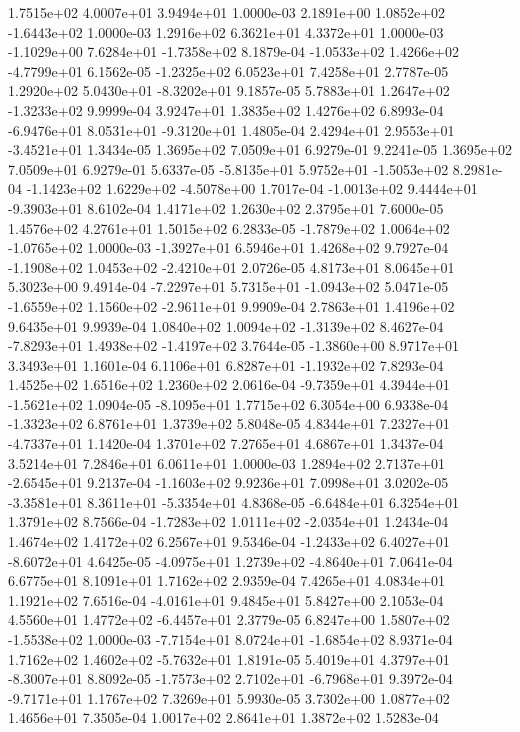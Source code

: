 1.7515e+02 4.0007e+01 3.9494e+01  1.0000e-03
 2.1891e+00  1.0852e+02 -1.6443e+02  1.0000e-03
1.2916e+02 6.3621e+01 4.3372e+01  1.0000e-03
-1.1029e+00  7.6284e+01 -1.7358e+02  8.1879e-04
-1.0533e+02  1.4266e+02 -4.7799e+01  6.1562e-05
-1.2325e+02  6.0523e+01  7.4258e+01  2.7787e-05
 1.2920e+02  5.0430e+01 -8.3202e+01  9.1857e-05
 5.7883e+01  1.2647e+02 -1.3233e+02  9.9999e-04
3.9247e+01 1.3835e+02 1.4276e+02  6.8993e-04
-6.9476e+01  8.0531e+01 -9.3120e+01  1.4805e-04
 2.4294e+01  2.9553e+01 -3.4521e+01  1.3434e-05
1.3695e+02 7.0509e+01 6.9279e-01  9.2241e-05
1.3695e+02 7.0509e+01 6.9279e-01  5.6337e-05
-5.8135e+01  5.9752e+01 -1.5053e+02  8.2981e-04
-1.1423e+02  1.6229e+02 -4.5078e+00  1.7017e-04
-1.0013e+02  9.4444e+01 -9.3903e+01  8.6102e-04
1.4171e+02 1.2630e+02 2.3795e+01  7.6000e-05
1.4576e+02 4.2761e+01 1.5015e+02  6.2833e-05
-1.7879e+02  1.0064e+02 -1.0765e+02  1.0000e-03
-1.3927e+01  6.5946e+01  1.4268e+02  9.7927e-04
-1.1908e+02  1.0453e+02 -2.4210e+01  2.0726e-05
4.8173e+01 8.0645e+01 5.3023e+00  9.4914e-04
-7.2297e+01  5.7315e+01 -1.0943e+02  5.0471e-05
-1.6559e+02  1.1560e+02 -2.9611e+01  9.9909e-04
2.7863e+01 1.4196e+02 9.6435e+01  9.9939e-04
 1.0840e+02  1.0094e+02 -1.3139e+02  8.4627e-04
-7.8293e+01  1.4938e+02 -1.4197e+02  3.7644e-05
-1.3860e+00  8.9717e+01  3.3493e+01  1.1601e-04
 6.1106e+01  6.8287e+01 -1.1932e+02  7.8293e-04
1.4525e+02 1.6516e+02 1.2360e+02  2.0616e-04
-9.7359e+01  4.3944e+01 -1.5621e+02  1.0904e-05
-8.1095e+01  1.7715e+02  6.3054e+00  6.9338e-04
-1.3323e+02  6.8761e+01  1.3739e+02  5.8048e-05
 4.8344e+01  7.2327e+01 -4.7337e+01  1.1420e-04
1.3701e+02 7.2765e+01 4.6867e+01  1.3437e-04
3.5214e+01 7.2846e+01 6.0611e+01  1.0000e-03
 1.2894e+02  2.7137e+01 -2.6545e+01  9.2137e-04
-1.1603e+02  9.9236e+01  7.0998e+01  3.0202e-05
-3.3581e+01  8.3611e+01 -5.3354e+01  4.8368e-05
-6.6484e+01  6.3254e+01  1.3791e+02  8.7566e-04
-1.7283e+02  1.0111e+02 -2.0354e+01  1.2434e-04
1.4674e+02 1.4172e+02 6.2567e+01  9.5346e-04
-1.2433e+02  6.4027e+01 -8.6072e+01  4.6425e-05
-4.0975e+01  1.2739e+02 -4.8640e+01  7.0641e-04
6.6775e+01 8.1091e+01 1.7162e+02  2.9359e-04
7.4265e+01 4.0834e+01 1.1921e+02  7.6516e-04
-4.0161e+01  9.4845e+01  5.8427e+00  2.1053e-04
 4.5560e+01  1.4772e+02 -6.4457e+01  2.3779e-05
 6.8247e+00  1.5807e+02 -1.5538e+02  1.0000e-03
-7.7154e+01  8.0724e+01 -1.6854e+02  8.9371e-04
 1.7162e+02  1.4602e+02 -5.7632e+01  1.8191e-05
 5.4019e+01  4.3797e+01 -8.3007e+01  8.8092e-05
-1.7573e+02  2.7102e+01 -6.7968e+01  9.3972e-04
-9.7171e+01  1.1767e+02  7.3269e+01  5.9930e-05
3.7302e+00 1.0877e+02 1.4656e+01  7.3505e-04
1.0017e+02 2.8641e+01 1.3872e+02  1.5283e-04
